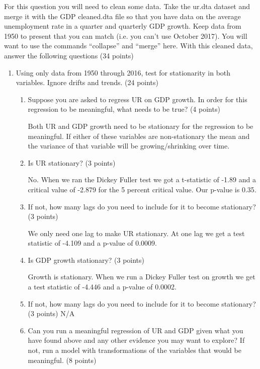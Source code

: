 \documentclass{article}
\begin{document}
For this question you will need to clean some data. Take the
ur.dta dataset and merge it with the GDP cleaned.dta file so that you have
data on the average unemployment rate in a quarter and quarterly GDP
growth. Keep data from 1950 to present that you can match (i.e. you can’t
use October 2017). You will want to use the commands “collapse” and
“merge” here. With this cleaned data, answer the following questions (34
points)
\begin{enumerate}
\item Using only data from 1950 through 2016, test for stationarity in both variables. Ignore drifts and trends. (24 points)
\begin{enumerate}
\item Suppose you are asked to regress UR on GDP growth. In order for this regression to be meaningful, what needs to be true? (4 points)

Both UR and GDP growth need to be stationary for the regression to be meaningful.  If either of these variables are non-stationary the mean and the variance of that variable will be growing/shrinking over time.  

\item Is UR stationary? (3 points)

No.  When we ran the Dickey Fuller test we got a t-statistic of -1.89 and a critical value of -2.879 for the 5 percent critical value.  Our p-value is 0.35.

\item If not, how many lags do you need to include for it to become stationary? (3 points)

We only need one lag to make UR stationary.  At one lag we get a test statistic of -4.109 and a p-value of 0.0009.

\item Is GDP growth stationary? (3 points)

Growth is stationary.  When we run a Dickey Fuller test on growth we get a test statistic of -4.446 and a p-value of 0.0002.

\item If not, how many lags do you need to include for it to become stationary? (3 points)
N/A

\item Can you run a meaningful regression of UR and GDP given what you have found above and any other evidence you may want to explore? If not, run a model with transformations of the variables that would be meaningful. (8 points)


\end{enumerate}
\end{enumerate}
\end{document}
